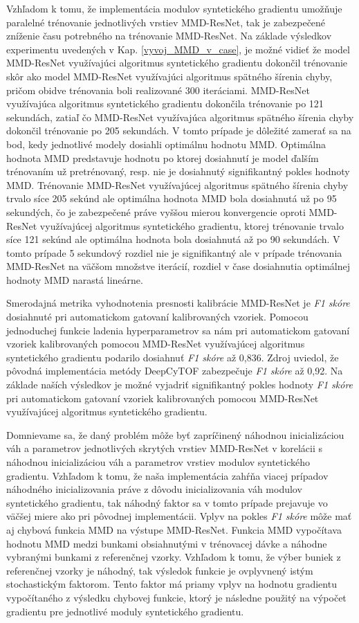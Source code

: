 Vzhľadom k tomu, že implementácia modulov syntetického gradientu umožňuje paralelné trénovanie jednotlivých vrstiev MMD-ResNet, tak je zabezpečené zníženie času potrebného na trénovanie MMD-ResNet. Na základe výsledkov experimentu uvedených v Kap. \ref{vyvoj_MMD_v_case}, je možné vidieť že model MMD-ResNet využívajúci algoritmus syntetického gradientu dokončil trénovanie skôr ako model MMD-ResNet využívajúci algoritmus spätného šírenia chyby, pričom obidve trénovania boli realizované 300 iteráciami. MMD-ResNet využívajúca algoritmus syntetického gradientu dokončila trénovanie po 121 sekundách, zatiaľ čo MMD-ResNet využívajúca algoritmus spätného šírenia chyby dokončil trénovanie po 205 sekundách. V tomto prípade je dôležité zamerať sa na bod, kedy jednotlivé modely dosiahli optimálnu hodnotu MMD. Optimálna hodnota MMD predstavuje hodnotu po ktorej dosiahnutí je model ďalším trénovaním už pretrénovaný, resp. nie je dosiahnutý signifikantný pokles hodnoty MMD. Trénovanie MMD-ResNet využívajúcej algoritmus spätného šírenia chyby trvalo síce 205 sekúnd ale optimálna hodnota MMD bola dosiahnutá už po 95 sekundých, čo je zabezpečené práve vyššou mierou konvergencie oproti MMD-ResNet využívajúcej algoritmus syntetického gradientu, ktorej trénovanie trvalo síce 121 sekúnd ale optimálna hodnota bola dosiahnutá až po 90 sekundách. V tomto prípade 5 sekundový rozdiel nie je signifikantný ale v prípade trénovania MMD-ResNet na väčšom množstve iterácií, rozdiel v čase dosiahnutia optimálnej hodnoty MMD narastá lineárne.

Smerodajná metrika vyhodnotenia presnosti kalibrácie MMD-ResNet je \textit{F1 skóre} dosiahnuté pri automatickom gatovaní kalibrovaných vzoriek. Pomocou jednoduchej funkcie ladenia hyperparametrov sa nám pri automatickom gatovaní vzoriek kalibrovaných pomocou MMD-ResNet využívajúcej algoritmus syntetického gradientu podarilo dosiahnuť \textit{F1 skóre} až 0,836. Zdroj \cite{Li2017} uviedol, že pôvodná implementácia metódy DeepCyTOF zabezpečuje \textit{F1 skóre} až 0,92. Na základe naších výsledkov je možné vyjadriť signifikantný pokles hodnoty \textit{F1 skóre} pri automatickom gatovaní vzoriek kalibrovaných pomocou MMD-ResNet využívajúcej algoritmus syntetického gradientu. 

Domnievame sa, že daný problém môže byť zapríčinený náhodnou inicializáciou váh a parametrov jednotlivých skrytých vrstiev MMD-ResNet v korelácii s náhodnou inicializáciou váh a parametrov vrstiev modulov syntetického gradientu. Vzhľadom k tomu, že naša implementácia zahŕňa viacej prípadov náhodného inicializovania práve z dôvodu inicializovania váh modulov syntetického gradientu, tak náhodný faktor sa v tomto prípade prejavuje vo väčšej miere ako pri pôvodnej implementácii. Vplyv na pokles \textit{F1 skóre} môže mať aj chybová funkcia MMD na výstupe MMD-ResNet. Funkcia MMD vypočítava hodnotu MMD medzi bunkami obsiahnutými v trénovacej dávke a náhodne vybranými bunkami z referenčnej vzorky. Vzhľadom k tomu, že výber buniek z referenčnej vzorky je náhodný, tak výsledok funkcie je ovplyvnený istým stochastickým faktorom. Tento faktor má priamy vplyv na hodnotu gradientu vypočítaného z výsledku chybovej funkcie, ktorý je následne použitý na výpočet gradientu pre jednotlivé moduly syntetického gradientu.

